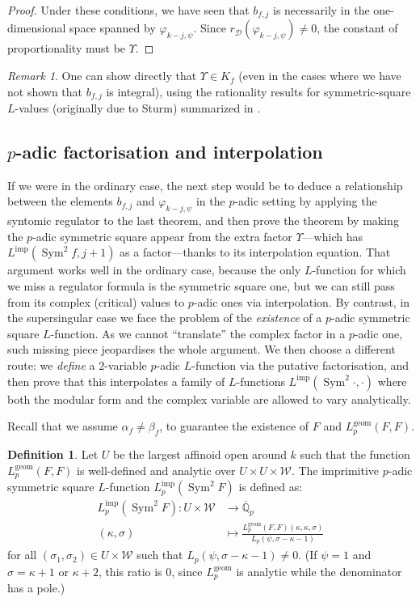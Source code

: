 \documentclass[11pt, a4paper, reqno]{amsart}
\theoremstyle{definition}
\newtheorem{definition}{Definition}[subsection]
\theoremstyle{plain}
\theoremstyle{remark}
\newtheorem*{remark}{Remark}
\DeclareMathOperator{\Sym}{Sym}
\newcommand{\numberset}{\mathbb}
\newcommand{\Q}{\numberset{Q}}
\renewcommand{\phi}{\varphi}
\newcommand{\del}{\mathcal{D}}
\newcommand{\Weight}{\mathcal{W}}
\newcommand{\Lgeom}{L_p^{\mathrm{geom}}}
\newcommand{\Limp}{L^{\mathrm{imp}}}
\begin{document}
  \begin{proof}
   Under these conditions, we have seen that $b_{f, j}$ is necessarily in the one-dimensional space spanned by $\varphi_{k-j, \psi}$. Since $r_{\del}(\varphi_{k-j, \psi}) \ne 0$, the constant of proportionality must be $\Upsilon$.
  \end{proof}

  \begin{remark}
   One can show directly that $\Upsilon \in K_f$ (even in the cases where we have not shown that $b_{f, j}$ is integral), using the rationality results for symmetric-square $L$-values (originally due to Sturm) summarized in \cite[Corollary~2.6]{schmidt88}.
  \end{remark}

 \subsection{\texorpdfstring{$p$}{p}-adic factorisation and interpolation}

  If we were in the ordinary case, the next step would be to deduce a relationship between the elements $b_{f, j}$ and $\phi_{k-j, \psi}$ in the $p$-adic setting by applying the syntomic regulator to the last theorem, and then prove the theorem by making the $p$-adic symmetric square appear from the extra factor $\Upsilon$---which has $\Limp(\Sym^2 f,j+1)$ as a factor---thanks to its interpolation equation. That argument works well in the ordinary case, because the only $L$-function for which we miss a regulator formula is the symmetric square one, but we can still pass from its complex (critical) values to $p$-adic ones via interpolation. By contrast, in the supersingular case we face the problem of the \emph{existence} of a $p$-adic symmetric square $L$-function. As we cannot ``translate'' the complex factor in a $p$-adic one, such missing piece jeopardises the whole argument. We then choose a different route: we \emph{define} a $2$-variable $p$-adic $L$-function via the putative factorisation, and then prove that this interpolates a family of $L$-functions $\Limp(\Sym^2 \cdot, \cdot)$ where both the modular form and the complex variable are allowed to vary analytically.

  Recall that we assume $\alpha_f\neq\beta_f$, to guarantee the existence of $F$ and $\Lgeom(F,F)$.
  \begin{definition}
   Let $U$ be the largest affinoid open around $k$ such that the function $\Lgeom(F,F)$ is well-defined and analytic over $U\times U\times\Weight$. The imprimitive $p$-adic symmetric square $L$-function $\Limp_p(\Sym^2 F)$ is defined as:
   \begin{align*}
    \Limp_p(\Sym^2 F) \colon U\times \Weight &\to \overline{\Q}_p \\
    (\kappa, \sigma) &\mapsto \frac{\Lgeom(F,F)(\kappa, \kappa, \sigma)} {L_p(\psi,\sigma-\kappa-1)}
   \end{align*}
   for all $(\sigma_1,\sigma_2)\in U\times\Weight$ such that $L_p(\psi,\sigma-\kappa-1) \neq 0$. (If $\psi = 1$ and $\sigma = \kappa + 1$ or $\kappa+2$, this ratio is 0, since $\Lgeom$ is analytic while the denominator has a pole.)
  \end{definition}
\end{document}
